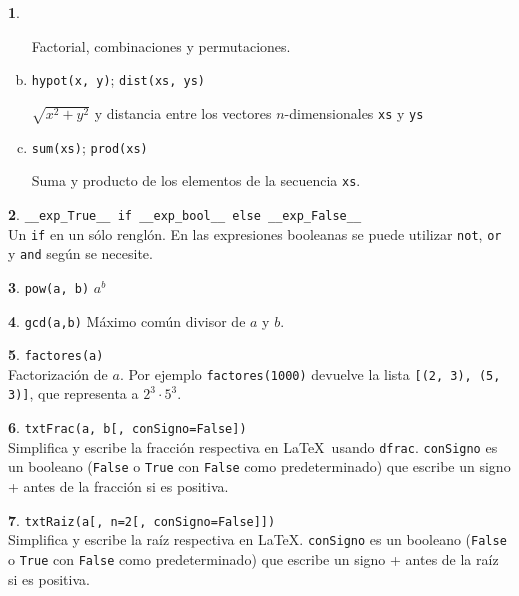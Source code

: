 \documentclass[12pt]{article}
\theoremstyle{definition}
\newtheorem{funcion}{}[section]
\begin{document}
\begin{funcion}
\begin{enumerate}[a)]
      Factorial, combinaciones y permutaciones.

    \item \verb|hypot(x, y)|; \verb|dist(xs, ys)|

      $\sqrt{x^2+y^2}$ y distancia entre los vectores $n$-dimensionales  \verb|xs| y \verb|ys|

    \item \verb|sum(xs)|; \verb|prod(xs)|

      Suma y producto de los elementos de la secuencia \verb|xs|.

  \end{enumerate}
\end{funcion}

\begin{funcion} \verb|__exp_True__ if __exp_bool__ else __exp_False__| \\[1ex]
  Un \verb|if| en un s\'olo rengl\'on. En las expresiones booleanas se puede utilizar \verb|not|, \verb|or| y \verb|and| seg\'un se necesite.
\end{funcion}

\begin{funcion}
  \verb|pow(a, b)| \quad
  $a^b$
\end{funcion}

\begin{funcion}
  \verb|gcd(a,b)| \quad
  M\'aximo com\'un divisor de $a$ y $b$.
\end{funcion}

\begin{funcion}
  \verb|factores(a)| \\[1ex]
  Factorizaci\'on de $a$. Por ejemplo \verb|factores(1000)| devuelve la lista \verb|[(2, 3), (5, 3)]|, que representa a $2^3\cdot 5^3$.
\end{funcion}

\begin{funcion}
  \verb|txtFrac(a, b[, conSigno=False])| \\[1ex]
  Simplifica y escribe la fracci\'on respectiva en \LaTeX\ usando \verb|dfrac|. \verb|conSigno| es un booleano (\verb|False| o \verb|True| con \verb|False| como predeterminado) que escribe un signo + antes de la fracci\'on si es positiva.
\end{funcion}

\begin{funcion}
  \verb|txtRaiz(a[, n=2[, conSigno=False]])| \\[1ex]
  Simplifica y escribe la ra\'iz respectiva en \LaTeX. \verb|conSigno| es un booleano (\verb|False| o \verb|True| con \verb|False| como predeterminado) que escribe un signo + antes de la ra\'iz si es positiva.
\end{funcion}
\end{document}
